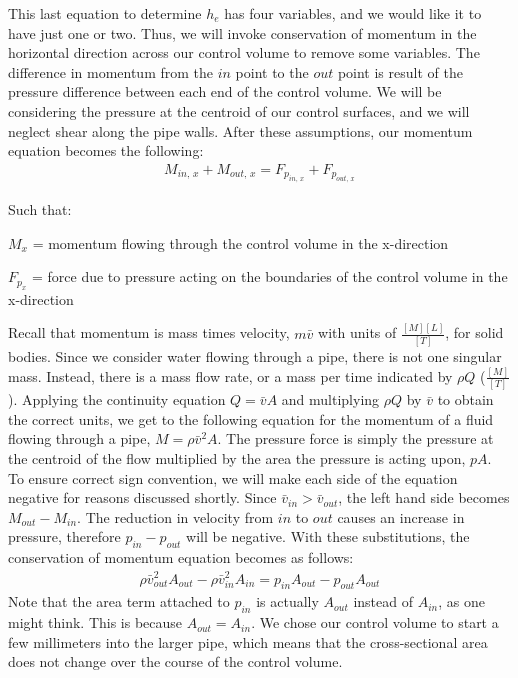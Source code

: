 \documentclass[letterpaper,10pt,english]{sphinxmanual}
\begin{document}
This last equation to determine \(h_e\) has four variables, and we would like it to have just one or two. Thus, we will invoke conservation of momentum in the horizontal direction across our control volume to remove some variables. The difference in momentum from the \(in\) point to the \(out\) point is result of the pressure difference between each end of the control volume. We will be considering the pressure at the centroid of our control surfaces, and we will neglect shear along the pipe walls. After these assumptions, our momentum equation becomes the following:
\begin{equation}\label{equation:Fluids_Review/Fluids_Review_Derivations:Fluids_Review/Fluids_Review_Derivations:4}
\begin{split}M_{in, \, x} + M_{out, \, x} = F_{p_{in, \, x}} + F_{p_{out, \, x}}\end{split}
\end{equation}
\begin{DUlineblock}{0em}
\item[] Such that:
\item[] \(M_{x}\) = momentum flowing through the control volume in the x-direction
\item[] \(F_{p_x}\) = force due to pressure acting on the boundaries of the control volume in the x-direction
\end{DUlineblock}

Recall that momentum is mass times velocity, \(m\bar v\) with units of \(\frac{[M][L]}{[T]}\), for solid bodies. Since we consider water flowing through a pipe, there is not one singular mass. Instead, there is a mass flow rate, or a mass per time indicated by \(\rho Q\) (\(\frac{[M]}{[T]}\)). Applying the continuity equation \(Q = \bar v A\) and multiplying \(\rho Q\) by \(\bar v\) to obtain the correct units, we get to the following equation for the momentum of a fluid flowing through a pipe, \(M = \rho \bar v^2 A\). The pressure force is simply the pressure at the centroid of the flow multiplied by the area the pressure is acting upon, \(p A\). To ensure correct sign convention, we will make each side of the equation negative for reasons discussed shortly. Since \(\bar v_{in} > \bar v_{out}\), the left hand side becomes \(M_{out} - M_{in}\). The reduction in velocity from \(in\) to \(out\) causes an increase in pressure, therefore \(p_{in} - p_{out}\) will be negative. With these substitutions, the conservation of momentum equation becomes as follows:
\begin{equation}\label{equation:Fluids_Review/Fluids_Review_Derivations:Fluids_Review/Fluids_Review_Derivations:5}
\begin{split}\rho \bar v_{out}^2 A_{out} - \rho \bar v_{in}^2 A_{in} = p_{in} A_{out} - p_{out} A_{out}\end{split}
\end{equation}
Note that the area term attached to \(p_{in}\) is actually \(A_{out}\) instead of \(A_{in}\), as one might think. This is because \(A_{out} = A_{in}\). We chose our control volume to start a
few millimeters into the larger pipe, which means that the cross-sectional area does not change over the course of the control volume.
\end{document}
